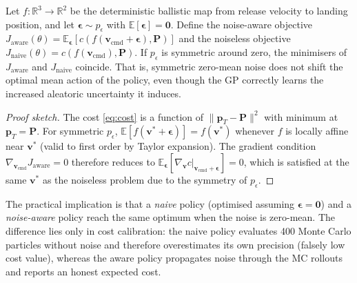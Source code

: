 \begin{proposition}
\label{prop:zeromean}
Let $f: \mathbb{R}^3 \to \mathbb{R}^2$ be the deterministic ballistic map from release
velocity to landing position, and let $\boldsymbol{\epsilon} \sim p_\epsilon$ with
$\mathbb{E}[\boldsymbol{\epsilon}] = \mathbf{0}$.
Define the noise-aware objective
$J_{\mathrm{aware}}(\theta) = \mathbb{E}_{\boldsymbol{\epsilon}}[c(f(\mathbf{v}_{\mathrm{cmd}}
+ \boldsymbol{\epsilon}), \mathbf{P})]$
and the noiseless objective
$J_{\mathrm{naive}}(\theta) = c(f(\mathbf{v}_{\mathrm{cmd}}), \mathbf{P})$.
If $p_\epsilon$ is symmetric around zero, the minimisers of $J_{\mathrm{aware}}$ and
$J_{\mathrm{naive}}$ coincide.
That is, symmetric zero-mean noise does not shift the optimal mean action of the policy,
even though the GP correctly learns the increased aleatoric uncertainty it induces.
\end{proposition}

\begin{proof}[Proof sketch]
The cost \eqref{eq:cost} is a function of $\|\mathbf{p}_T - \mathbf{P}\|^2$ with
minimum at $\mathbf{p}_T = \mathbf{P}$.
For symmetric $p_\epsilon$, $\mathbb{E}[f(\mathbf{v}^* + \boldsymbol{\epsilon})]
= f(\mathbf{v}^*)$ whenever $f$ is locally affine near $\mathbf{v}^*$
(valid to first order by Taylor expansion).
The gradient condition
$\nabla_{\mathbf{v}_{\mathrm{cmd}}} J_{\mathrm{aware}} = 0$ therefore reduces to
$\mathbb{E}_{\boldsymbol{\epsilon}}[\nabla_{\mathbf{v}} c \big|_{\mathbf{v}_{\mathrm{cmd}}
+ \boldsymbol{\epsilon}}] = 0$, which is satisfied at the same $\mathbf{v}^*$ as the
noiseless problem due to the symmetry of $p_\epsilon$.
\end{proof}

The practical implication is that a \emph{naive} policy (optimised assuming
$\boldsymbol{\epsilon} = \mathbf{0}$) and a \emph{noise-aware} policy reach the same
optimum when the noise is zero-mean.
The difference lies only in cost calibration: the naive policy evaluates 400 Monte
Carlo particles without noise and therefore overestimates its own precision
(falsely low cost value), whereas the aware policy propagates noise through the
MC rollouts and reports an honest expected cost.

